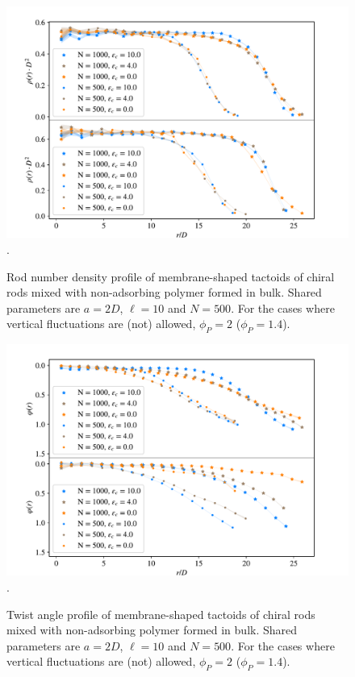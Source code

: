\begin{figure}
\begin{center}
\includegraphics[width= .9\columnwidth]{figures/chapter-5/density}.
	\caption{Rod number density profile of membrane-shaped tactoids of chiral rods mixed with non-adsorbing polymer formed in bulk. Shared parameters are $a = 2D$, $\ell = 10$ and $N = 500$. For the cases where vertical fluctuations are (not) allowed, $\phi_P=2$ ($\phi_P=1.4$). } %
\end{center}
\end{figure}


\begin{figure}
\begin{center}
\includegraphics[width= .9\columnwidth]{figures/chapter-5/twistprofile}.
	\caption{Twist angle profile of membrane-shaped tactoids of chiral rods mixed with non-adsorbing polymer formed in bulk. Shared parameters are $a = 2D$, $\ell = 10$ and $N = 500$. For the cases where vertical fluctuations are (not) allowed, $\phi_P=2$ ($\phi_P=1.4$). } %
\end{center}
\end{figure}


